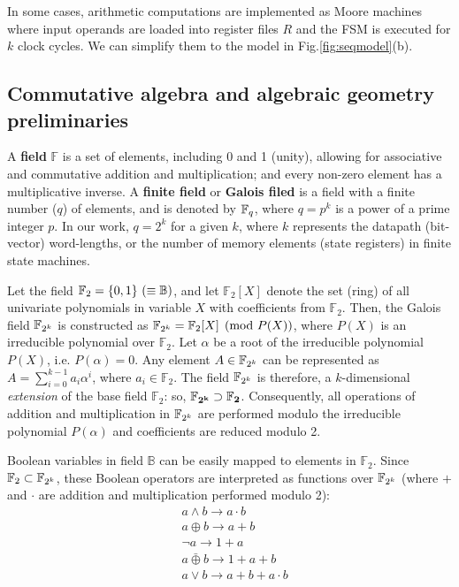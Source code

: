 In some cases, arithmetic computations are implemented as Moore machines where input operands
are loaded into register files $R$ and the FSM is executed for $k$ clock cycles.
We can simplify them to the model in Fig.\ref{fig:seqmodel}(b).

\subsection{Commutative algebra and algebraic geometry preliminaries}
A {\bf field} $\mathbb{F}$ is a set of elements, including 0 and 1 (unity),
allowing for associative and commutative addition and multiplication;
and every non-zero element has a multiplicative inverse.  A {\bf
  finite field} or {\bf Galois filed} is a field with a finite number
($q$) of elements, and is denoted by ${\mathbb{F}}_{q}$, where $q=p^k$ is a power of
a prime integer $p$. In our work, $q = 2^k$ for
a given $k$, where $k$ represents the datapath (bit-vector)
word-lengths, or the number of memory elements (state registers) in
finite state machines. 

Let the field $\mathbb{F}_2 = \{0, 1\} ~(\equiv {\mathbb{B}})$, and let
$\mathbb{F}_2[X]$ denote the set (ring) of all univariate polynomials
in variable $X$ with coefficients from $\mathbb{F}_2$. Then, the
Galois field ${\mathbb{F}}_{2^k}$ is constructed as ${\mathbb{F}}_{2^k} = \mathbb{F}_2[X] \pmod{
  P(X)}$, where $P(X)$ is an irreducible polynomial over
$\mathbb{F}_2$. Let $\alpha$ be a root of the irreducible polynomial
$P(X)$, i.e. $P(\alpha) = 0$. Any element $A \in {\mathbb{F}}_{2^k}$ can be
represented as $A = \sum_{i=0}^{k-1} a_i \alpha^i$, where $a_i \in
\mathbb{F}_2$. The field ${\mathbb{F}}_{2^k}$ is therefore, a $k$-dimensional {\it
  extension} of the base field $\mathbb{F}_2$: so,  $\mathbf{{\mathbb{F}}_{2^k} \supset
\mathbb{F}_2}$. Consequently, all operations of addition and
multiplication in ${\mathbb{F}}_{2^k}$ are performed modulo the irreducible
polynomial $P(\alpha)$ and coefficients are reduced modulo 2.  

Boolean variables in field $\mathbb B$ can be easily mapped to
elements in $\mathbb F_2$. Since $\mathbb F_2 \subset {\mathbb{F}}_{2^k}$, these 
Boolean operators are interpreted as functions over ${\mathbb{F}}_{2^k}$ (where $+$
and $\cdot$ are addition and multiplication performed modulo 2): 
\begin{align*}
&a\land b \to a\cdot b\\
&a\oplus b \to a+b\\
&\neg a \to 1+a\\
&a \bar{\oplus} b \to 1+a+b\\
&a \lor b \to a+b+a\cdot b
\end{align*}

